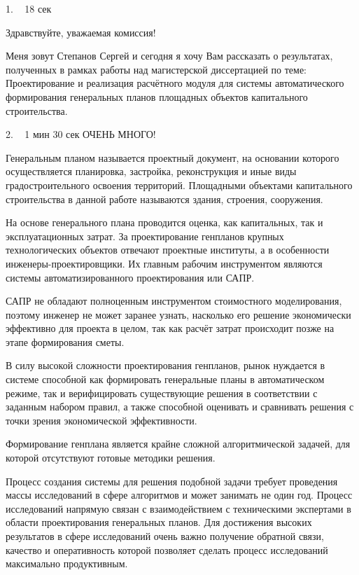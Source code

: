 \documentclass[11pt]{article}
\begin{document}
    1. ~ 18 сек

    Здравствуйте, уважаемая комиссия!

    Меня зовут Степанов Сергей и сегодня я хочу Вам рассказать о результатах,
    полученных в рамках работы над магистерской диссертацией по теме:
    Проектирование и реализация расчётного модуля для системы автоматического формирования
    генеральных планов площадных объектов капитального строительства.


    2. ~ 1 мин 30 сек ОЧЕНЬ МНОГО!

    Генеральным планом называется
    проектный документ, на основании которого осуществляется планировка,
    застройка, реконструкция и иные виды градостроительного освоения территорий.
    Площадными объектами капитального строительства в данной работе называются здания, строения, сооружения.

    На основе генерального плана проводится оценка, как капитальных, так и эксплуатационных затрат.
    За проектирование генпланов крупных технологических объектов отвечают проектные институты,
    а в особенности инженеры-проектировщики. Их главным рабочим инструментом
    являются системы автоматизированного проектирования или САПР.

    САПР не обладают полноценным инструментом стоимостного моделирования,
    поэтому инженер не может заранее узнать,
    насколько его решение экономически эффективно для проекта в целом,
    так как расчёт затрат происходит позже на этапе формирования сметы.

    В силу высокой сложности проектирования генпланов,
    рынок нуждается в системе способной как формировать генеральные планы в автоматическом режиме,
    так и верифицировать существующие решения в соответствии с заданным набором правил,
    а также способной оценивать и сравнивать решения с точки зрения экономической эффективности.

    Формирование генплана является крайне сложной алгоритмической задачей,
    для которой отсутствуют готовые методики решения.

    Процесс создания системы для решения подобной задачи требует
    проведения массы исследований в сфере алгоритмов и может занимать не один год.
    Процесс исследований напрямую связан с взаимодействием с техническими экспертами
    в области проектирования генеральных планов.
    Для достижения высоких результатов в сфере исследований очень важно получение обратной связи,
    качество и оперативность которой позволяет сделать процесс исследований максимально продуктивным.
\end{document}
